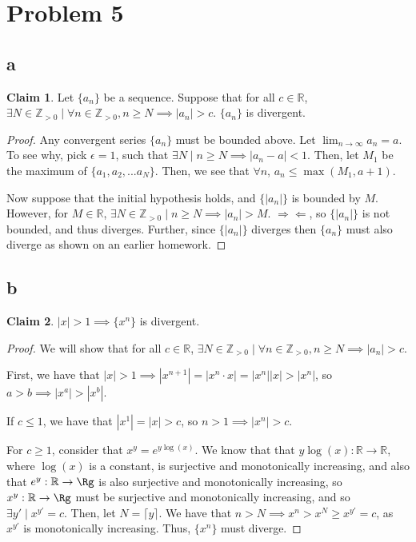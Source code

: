 \documentclass[12pt,letterpaper]{article}
\theoremstyle{definition}
\newtheorem*{claim}{Claim}
\newcommand{\contra}{\Rightarrow\!\Leftarrow}
\newcommand{\R}{\mathbb{R}}
\newcommand{\Zg}{\mathbb{Z}_{>0}}
\begin{document}
\section*{Problem 5}
\subsection*{a}

\begin{claim}
  Let $\{ a_n \}$ be a sequence. Suppose that for all $c \in \R$, $\exists  N
  \in \Zg \mid \forall n \in \Zg, n \geq N \implies |a_n| > c$. $\{a_n\}$ is divergent.
\end{claim}

\begin{proof}
  Any convergent series $\{ a_n \}$ must be bounded above. Let $\lim_{n\rightarrow
    \infty}a_n = a$. To see why, pick $\epsilon = 1$, such that $\exists N \mid
  n \geq N \implies |a_n - a| < 1$. Then, let $M_1$ be the maximum of
  $\{a_1,a_2,...a_N\}$. Then, we see that $\forall n$, $a_n \leq \max(M_1, a + 1)$.

  Now suppose that the initial hypothesis holds, and $\{ |a_n| \}$ is bounded by
  $M$. However, for $M \in \R$, $\exists N \in \Zg \mid n \geq N \implies
  |a_n| > M$. $\contra$, so $\{ |a_n| \}$ is not bounded, and thus diverges.
  Further, since  $\{|a_n|\}$ diverges then $\{a_n\}$ must also diverge as shown
  on an earlier homework.
\end{proof}

\subsection*{b}

\begin{claim}
  $|x| > 1 \implies \{x^n\}$ is divergent.
\end{claim}

\begin{proof}
  We will show that for all $c \in \R$, $\exists N \in \Zg \mid \forall n \in
  \Zg, n \geq N \implies |a_n| > c$.
  
  First, we have that $|x| > 1 \implies |x^{n+1}| = |x^n \cdot x| = |x^n||x| >
  |x^n|$, so $a > b \implies |x^a| > |x^b|$.

  If $c \leq 1$, we have that $|x^1| = |x| > c$, so $n > 1 \implies |x^n| > c$.
 
  For $c \geq 1$, consider that $x^y = e^{y\log(x)}$. We know that that $y\log(x): \R
  \rightarrow \R$, where $\log(x)$ is a constant, is surjective and
  monotonically increasing, and also that $e^y: \R \rightarrow \Rg$ is also
  surjective and monotonically increasing, so $x^y: \R \rightarrow \Rg$ must be
  surjective and monotonically increasing, and so $\exists y' \mid x^{y'} = c$.
  Then, let $N = \lceil y \rceil$. We have that $n > N \implies x^n > x^N \geq
  x^{y'} = c$, as $x^{y'}$ is monotonically increasing. Thus, $\{x^n\}$ must diverge.
\end{proof}
\end{document}
